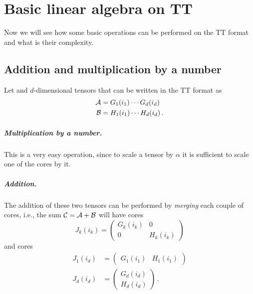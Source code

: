 \chapter{Basic linear algebra on TT}
Now we will see how some basic operations can be performed on the TT format and what is their complexity.

\section{Addition and multiplication by a number}
Let \A and \B $d$-dimensional tensors that can be written in the TT format as
\begin{equation*}
  \begin{split}
    \mathcal{A} &= G_1(i_1) \cdots G_d(i_d)\\
    \mathcal{B} &= H_1(i_1) \cdots H_d(i_d)\, .
  \end{split}
\end{equation*}

\paragraph{Multiplication by a number.}
This is a very easy operation, since to scale a tensor by $\alpha$ it is sufficient to scale one of the cores by it.

\paragraph{Addition.}
The addition of these two tensors can be performed by \emph{merging} each couple of cores, i.e., the sum $\mathcal{C} = \mathcal{A} + \mathcal{B}$ will have  cores
\begin{equation*}
  J_k(i_k) = 
  \begin{pmatrix}
    G_k(i_k) & 0\\
    0 & H_k(i_k)
  \end{pmatrix}
\end{equation*}
and  cores
\begin{equation*}
  \begin{split}
    J_1(i_d) &= 
  \begin{pmatrix}
    G_1(i_1) & H_1(i_1)
  \end{pmatrix}\\
  J_d(i_d) &= 
  \begin{pmatrix}
    G_d(i_d)\\
    H_d(i_d)
  \end{pmatrix}\, .
  \end{split}
\end{equation*}

